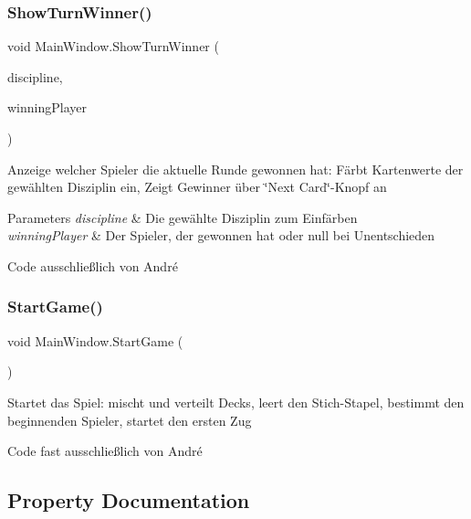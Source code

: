 \subsubsection{\texorpdfstring{Show\+Turn\+Winner()}{ShowTurnWinner()}}
{\footnotesize\ttfamily void Main\+Window.\+Show\+Turn\+Winner (\begin{DoxyParamCaption}\item[{\mbox{\hyperlink{namespace_poke_quet_aa425f1b8cf90847021fe1177d6a7199d}{Discipline}}}]{discipline,  }\item[{\mbox{\hyperlink{class_poke_quet_1_1_player}{Player}}}]{winning\+Player }\end{DoxyParamCaption})\hspace{0.3cm}{\ttfamily [inline]}}



Anzeige welcher Spieler die aktuelle Runde gewonnen hat\+: Färbt Kartenwerte der gewählten Disziplin ein, Zeigt Gewinner über \char`\"{}\+Next Card\char`\"{}-\/\+Knopf an 


\begin{DoxyParams}{Parameters}
{\em discipline} & Die gewählte Disziplin zum Einfärben\\
\hline
{\em winning\+Player} & Der Spieler, der gewonnen hat oder null bei Unentschieden\\
\hline
\end{DoxyParams}


Code ausschließlich von André\mbox{\label{class_main_window_a1eb0f2f5d231502046a64fef4a894a80}} 
\subsubsection{\texorpdfstring{Start\+Game()}{StartGame()}}
{\footnotesize\ttfamily void Main\+Window.\+Start\+Game (\begin{DoxyParamCaption}{ }\end{DoxyParamCaption})\hspace{0.3cm}{\ttfamily [inline]}}



Startet das Spiel\+: mischt und verteilt Decks, leert den Stich-\/\+Stapel, bestimmt den beginnenden Spieler, startet den ersten Zug 

Code fast ausschließlich von André

\subsection{Property Documentation}
\mbox{\label{class_main_window_a4ce463cb4e7d116640b55416557ea741}} 
